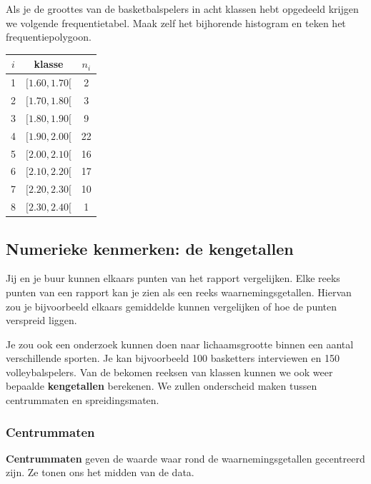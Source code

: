 \documentclass[12pt,twoside,a4paper]{article}
\begin{document}
\begin{oefening}
Als je de groottes van de basketbalspelers in acht klassen hebt opgedeeld krijgen we volgende frequentietabel. Maak zelf het bijhorende histogram en teken het frequentiepolygoon.\\
\begin{center}
\begin{tabular}{c|c|c}
$i$ & klasse     & $n_i$\\
\hline
  1 & $[ 1.60,  1.70[$ &   2\\
  2 & $[ 1.70,  1.80[$ &   3\\
  3 & $[ 1.80,  1.90[$ &   9\\
  4 & $[ 1.90,  2.00[$ &   22\\
  5 & $[ 2.00,  2.10[$ &   16\\
  6 & $[ 2.10,  2.20[$ &   17\\
  7 & $[ 2.20,  2.30[$ &   10\\
  8 & $[ 2.30,  2.40[$ &   1\\
\end{tabular}
\end{center}
\end{oefening}

\subsection{Numerieke kenmerken: de kengetallen}

Jij en je buur kunnen elkaars punten van het rapport vergelijken. Elke reeks punten van een rapport kan je zien als een reeks waarnemingsgetallen. Hiervan zou je bijvoorbeeld elkaars gemiddelde kunnen vergelijken of hoe de punten verspreid liggen.

Je zou ook een onderzoek kunnen doen naar lichaamsgrootte binnen een aantal verschillende sporten. Je kan bijvoorbeeld 100 basketters interviewen en 150 volleybalspelers. Van de bekomen reeksen van klassen kunnen we ook weer bepaalde {\bf kengetallen} berekenen. We zullen onderscheid maken tussen centrummaten en spreidingsmaten.

\subsubsection{Centrummaten}

{\bf Centrummaten} geven de waarde waar rond de waarnemingsgetallen gecentreerd zijn. Ze tonen ons het midden van de data.
\end{document}
